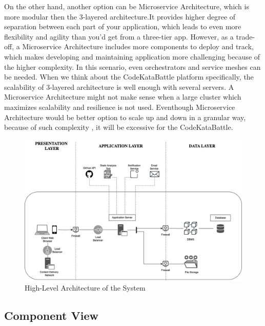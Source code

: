 \indent On the other hand, another option can be Microservice Architecture, which is more modular then the 3-layered architecture.It provides higher degree of separation between each part of your application, which leads to even more flexibility and agility than you'd get from a three-tier app. However, as a trade-off, a Microservice Architecture includes more components to deploy and track, which makes developing and maintaining application more challenging because of the higher complexity. In this scenario, even orchestrators and service meshes can be needed. When we think about the CodeKataBattle platform specifically, the scalability of 3-layered architecture is well enough with several servers. A Microservice Architecture might not make sense when a large cluster which maximizes scalability and resilience is not used. Eventhough Microservice Architecture would be better option to scale up and down in a granular way, because of such complexity , it will be excessive for the CodeKataBattle. \\

\begin{figure}[H]
    \centering
    \includegraphics[scale=0.25]{Images/DD-highlevel-architecture.drawio.png}
    \caption{High-Level Architecture of the System}
\end{figure}

\newpage 
\subsection{Component View}

